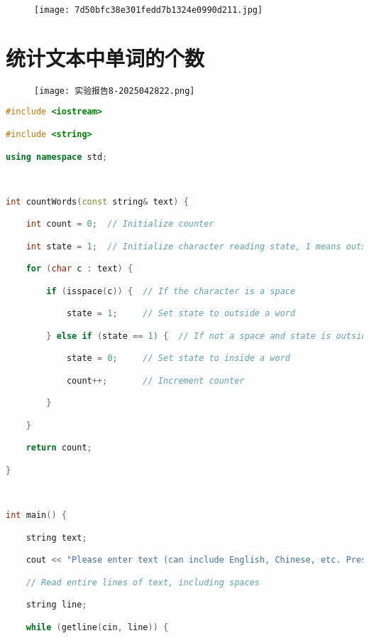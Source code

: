 \begin{figure}[H]
\centering
\texttt{[image: 7d50bfc38e301fedd7b1324e0990d211.jpg]}
\label{}
\end{figure}

\section{统计文本中单词的个数}

\begin{figure}[H]
\centering
\texttt{[image: 实验报告8-2025042822.png]}
\label{}
\end{figure}

\begin{lstlisting}[language=C++]
#include <iostream>

#include <string>

using namespace std;

  

int countWords(const string& text) {

    int count = 0;  // Initialize counter

    int state = 1;  // Initialize character reading state, 1 means outside a word

    for (char c : text) {

        if (isspace(c)) {  // If the character is a space

            state = 1;     // Set state to outside a word

        } else if (state == 1) {  // If not a space and state is outside a word

            state = 0;     // Set state to inside a word

            count++;       // Increment counter

        }

    }

    return count;

}

  

int main() {

    string text;

    cout << "Please enter text (can include English, Chinese, etc. Press Enter then Ctrl+Z to finish input):" << endl;

    // Read entire lines of text, including spaces

    string line;

    while (getline(cin, line)) {


\end{lstlisting}
